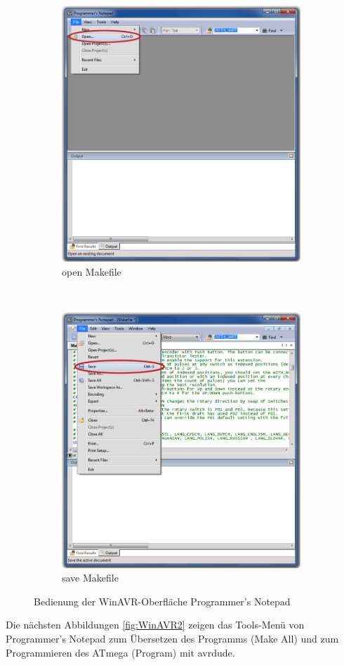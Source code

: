\begin{figure}[H]
  \begin{subfigure}[b]{9cm}
    \centering
    \includegraphics[width=9cm]{../PNG/Notepad_open.png}
    \caption{open Makefile}
  \end{subfigure}
  ~
  \begin{subfigure}[b]{9cm}
    \centering
    \includegraphics[width=9cm]{../PNG/Notepad_save.png}
    \caption{save Makefile}
  \end{subfigure}
  \caption{Bedienung der WinAVR-Oberfläche Programmer's Notepad}
  \label{fig:WinAVR1}
\end{figure}

Die nächsten Abbildungen \ref{fig:WinAVR2} zeigen das Tools-Menü von Programmer's Notepad
zum Übersetzen des Programms (Make All) und zum Programmieren des ATmega (Program) mit avrdude.

